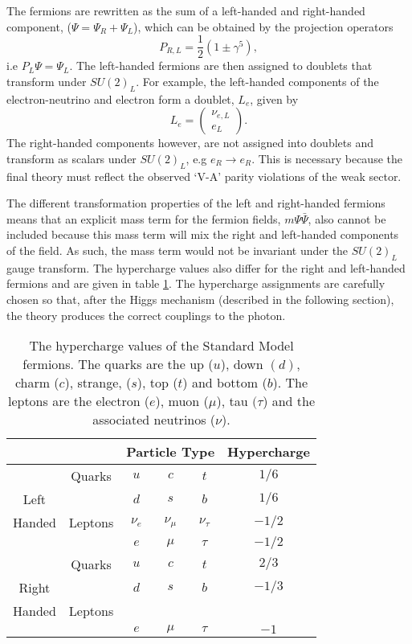 The fermions are rewritten as the sum of a left-handed and right-handed component, ($\Psi=\Psi_{R}+\Psi_{L}$), which can be obtained by the projection operators
\begin{equation}
P_{R,L} = \frac{1}{2}(1\pm \gamma^5),
\end{equation}
i.e $P_L \Psi = \Psi_L$.
The left-handed fermions are then assigned to doublets that transform under $SU(2)_L$. For example,
the left-handed components of the electron-neutrino and electron form a doublet, $L_e$, given by
\begin{equation}
L_e = \left(
\begin{array}{c}
\nu_{e, L} \\ e_L
\end{array}
\right) .
\end{equation}
The right-handed components however,  are not assigned into doublets and transform as scalars under $SU(2)_L$, e.g $e_R \rightarrow e_R$.
This is necessary because the final theory must reflect the observed `V-A' parity violations of the weak sector.

The different transformation properties of the left and right-handed fermions means that an explicit mass term for the fermion fields, $m \Psi \bar{\Psi}$, also cannot be included because this mass term will mix the right and left-handed components of the field. As such, the mass term would not be invariant under the $SU(2)_L$ gauge transform.
The hypercharge values also differ for the right and left-handed fermions and are given in table \ref{hypercharges}. The hypercharge assignments are carefully chosen so that, after the Higgs mechanism (described in the following section), the theory produces the correct couplings to the photon.

\begin{table}[t]
\centering
\begin{tabular}{|c|c|c|c|c|c|}
\hline
& & \multicolumn{3}{|c|}{Particle Type} & Hypercharge \\
\hline
& Quarks & $u$ & $c$ & $t$ & $1/6$ \\
Left &  & $d$ & $s$ & $b$ & $1/6$ \\
Handed & Leptons & $\nu_{e}$ & $\nu_{\mu}$ & $\nu_{\tau}$ & $-1/2$\\
& & $e$ & $\mu$ & $\tau$ & $-1/2$ \\
\hline \hline
& Quarks & $u$ & $c$  & $t$ & $2/3$\\
Right & & $d$ & $s$ & $b$ & $-1/3$\\
Handed & Leptons & & & &\\
& & $e$ & $\mu$ & $\tau$ & $-1$\\
\hline 
\end{tabular}
\caption[The hypercharge values of the Standard Model fermions]{The hypercharge values of the Standard Model fermions. The quarks are the up ($u$), down $(d)$, charm ($c$), strange, ($s$), top ($t$) and bottom ($b$). The leptons are the electron ($e$), muon ($\mu$), tau $(\tau$) and the associated neutrinos ($\nu$). \label{hypercharges}}
\end{table}%

